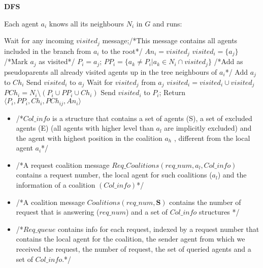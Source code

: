 \documentclass{article}
\begin{document}
       
      
\begin{algorithm}[!tb]
\caption{\textbf{DFS}}
Each agent $a_i$ knows all its neighbours $N_i$ in $G$ and runs: 
\begin{algorithmic}[1]
	\STATE Wait for any incoming $visited_{j}$ message;/*This message contains all
	agents included in the branch from $a_i$ to the root*/
	\STATE $An_i = visited_{j}$ 
	\STATE $visited_i = \{
	a_{j} \}$ /*Mark $a_{j}$ as visited*/ \STATE $P_i = a_{j}$;
	\STATE $PP_i = \{ a_{k} \neq  P_i \vert a_{k}\in N_i \cap visited_j \}$ /*Add
	as pseudoparents all already visited agents up in the tree neighbours of
	$a_i$*/
\ENDIF
{}
		\STATE Add $a_j$ to $Ch_i$
		\STATE Send $visited_i$ to $a_j$
		\STATE Wait for $visited_j$ from $a_j$
		\STATE $visited_i = visited_i \cup visited_j$
	\ENDIF
\ENDFOR
\STATE $PCh_i =  N_i \setminus (P_i\cup PP_i\cup Ch_i)$
\STATE Send $visited_i$ to $P_i$;
\STATE Return $\langle P_i, PP_i, Ch_i, PCh_{ij}, An_i\rangle$
\end{algorithmic}
\label{proc:dfs}
\end{algorithm}

\begin{itemize}
\item /*$Col\_info$ is a structure that contains a set of agents (S), a set of
excluded agents (E) (all agents with higher level than $a_l$ are implicitly
excluded) and the agent with highest position in the coalition $a_h$ , different
from the local agent $a_i$*/
\item /*A request coalition message $Req\_Coalitions(req\_num,a_l,Col\_info)$
contains a request number, the local agent for such coalitions ($a_l$) and the
information of a coalition $(Col\_info)$*/ 
\item /*A coalition message
$Coalitions(req\_num,\mathbf{S})$ contains the number of request that is
answering ($req\_num$) and a set of $Col\_info$ structures */ 
\item /*$Req\_queue$ contains info for each request, indexed by a request
number that contains the local agent for the coalition, 
the sender agent from which we received the request, the number of request, the
set of queried agents and a set of $Col\_info$.*/
\end{itemize}  
\end{document}
